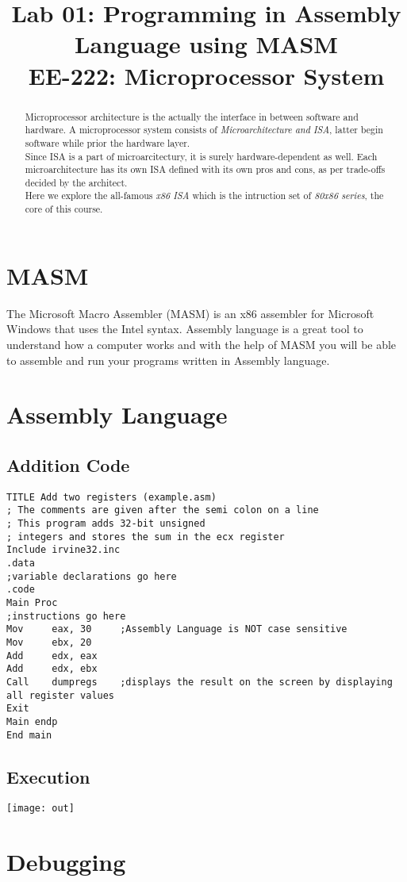 \documentclass{article}
\title{Lab 01: Programming in Assembly Language using MASM \\ \large EE-222: Microprocessor System}
\begin{document}
\maketitle
\tableofcontents
\newpage
\begin{abstract}
Microprocessor architecture is the actually the interface in between software and hardware. A microprocessor system consists of \emph{Microarchitecture and ISA}, latter begin software while prior the hardware layer. \\
Since ISA is a part of microarcitectury, it is surely hardware-dependent as well. Each microarchitecture has its own ISA defined with its own pros and cons, as per trade-offs decided by the architect. \\
Here we explore the all-famous \emph{x86 ISA} which is the intruction set of \emph{80x86 series}, the core of this course.
\newpage
\end{abstract}
\section{MASM}
The Microsoft Macro Assembler (MASM) is an x86 assembler for Microsoft Windows that uses the Intel syntax. Assembly language is a great tool to understand how a computer works and with the help of MASM you will be able to assemble and run your programs written in Assembly language.
\section{Assembly Language}
\subsection{Addition Code}
\begin{verbatim}
TITLE Add two registers (example.asm)
; The comments are given after the semi colon on a line
; This program adds 32-bit unsigned
; integers and stores the sum in the ecx register
Include irvine32.inc
.data
;variable declarations go here
.code
Main Proc
;instructions go here
Mov 	eax, 30		;Assembly Language is NOT case sensitive
Mov 	ebx, 20
Add 	edx, eax
Add 	edx, ebx
Call 	dumpregs	;displays the result on the screen by displaying all register values
Exit
Main endp
End main
\end{verbatim}
\subsection{Execution}
\texttt{[image: out]}
\newpage
\section{Debugging}
\end{document}
